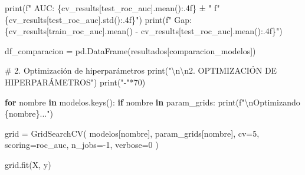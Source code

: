 \documentclass[
  doc,
  floatsintext,
  longtable,
  a4paper,
  nolmodern,
  notxfonts,
  notimes,
  12pt,
  colorlinks=true,linkcolor=blue,citecolor=blue,urlcolor=blue]{apa7}
\newenvironment{Shaded}{\begin{snugshade}}{\end{snugshade}}
\newcommand{\BuiltInTok}[1]{\textcolor[rgb]{0.00,0.23,0.31}{#1}}
\newcommand{\CharTok}[1]{\textcolor[rgb]{0.13,0.47,0.30}{#1}}
\newcommand{\CommentTok}[1]{\textcolor[rgb]{0.37,0.37,0.37}{#1}}
\newcommand{\ControlFlowTok}[1]{\textcolor[rgb]{0.00,0.23,0.31}{\textbf{#1}}}
\newcommand{\DecValTok}[1]{\textcolor[rgb]{0.68,0.00,0.00}{#1}}
\newcommand{\KeywordTok}[1]{\textcolor[rgb]{0.00,0.23,0.31}{\textbf{#1}}}
\newcommand{\NormalTok}[1]{\textcolor[rgb]{0.00,0.23,0.31}{#1}}
\newcommand{\OperatorTok}[1]{\textcolor[rgb]{0.37,0.37,0.37}{#1}}
\newcommand{\SpecialCharTok}[1]{\textcolor[rgb]{0.37,0.37,0.37}{#1}}
\newcommand{\SpecialStringTok}[1]{\textcolor[rgb]{0.13,0.47,0.30}{#1}}
\newcommand{\StringTok}[1]{\textcolor[rgb]{0.13,0.47,0.30}{#1}}
\begin{document}
\begin{Shaded}
\begin{Highlighting}[]
        \BuiltInTok{print}\NormalTok{(}\SpecialStringTok{f"  AUC: }\SpecialCharTok{\{}\NormalTok{cv\_results[}\StringTok{\textquotesingle{}test\_roc\_auc\textquotesingle{}}\NormalTok{]}\SpecialCharTok{.}\NormalTok{mean()}\SpecialCharTok{:.4f\}}\SpecialStringTok{ ± "}
              \SpecialStringTok{f"}\SpecialCharTok{\{}\NormalTok{cv\_results[}\StringTok{\textquotesingle{}test\_roc\_auc\textquotesingle{}}\NormalTok{]}\SpecialCharTok{.}\NormalTok{std()}\SpecialCharTok{:.4f\}}\SpecialStringTok{"}\NormalTok{)}
        \BuiltInTok{print}\NormalTok{(}\SpecialStringTok{f"  Gap: }\SpecialCharTok{\{}\NormalTok{cv\_results[}\StringTok{\textquotesingle{}train\_roc\_auc\textquotesingle{}}\NormalTok{]}\SpecialCharTok{.}\NormalTok{mean() }\OperatorTok{{-}}\NormalTok{ cv\_results[}\StringTok{\textquotesingle{}test\_roc\_auc\textquotesingle{}}\NormalTok{]}\SpecialCharTok{.}\NormalTok{mean()}\SpecialCharTok{:.4f\}}\SpecialStringTok{"}\NormalTok{)}
    
\NormalTok{    df\_comparacion }\OperatorTok{=}\NormalTok{ pd.DataFrame(resultados[}\StringTok{\textquotesingle{}comparacion\_modelos\textquotesingle{}}\NormalTok{])}
    
    \CommentTok{\# 2. Optimización de hiperparámetros}
    \BuiltInTok{print}\NormalTok{(}\StringTok{"}\CharTok{\textbackslash{}n\textbackslash{}n}\StringTok{2. OPTIMIZACIÓN DE HIPERPARÁMETROS"}\NormalTok{)}
    \BuiltInTok{print}\NormalTok{(}\StringTok{"{-}"}\OperatorTok{*}\DecValTok{70}\NormalTok{)}
    
    \ControlFlowTok{for}\NormalTok{ nombre }\KeywordTok{in}\NormalTok{ modelos.keys():}
        \ControlFlowTok{if}\NormalTok{ nombre }\KeywordTok{in}\NormalTok{ param\_grids:}
            \BuiltInTok{print}\NormalTok{(}\SpecialStringTok{f"}\CharTok{\textbackslash{}n}\SpecialStringTok{Optimizando }\SpecialCharTok{\{}\NormalTok{nombre}\SpecialCharTok{\}}\SpecialStringTok{..."}\NormalTok{)}
            
\NormalTok{            grid }\OperatorTok{=}\NormalTok{ GridSearchCV(}
\NormalTok{                modelos[nombre],}
\NormalTok{                param\_grids[nombre],}
\NormalTok{                cv}\OperatorTok{=}\DecValTok{5}\NormalTok{,}
\NormalTok{                scoring}\OperatorTok{=}\StringTok{\textquotesingle{}roc\_auc\textquotesingle{}}\NormalTok{,}
\NormalTok{                n\_jobs}\OperatorTok{={-}}\DecValTok{1}\NormalTok{,}
\NormalTok{                verbose}\OperatorTok{=}\DecValTok{0}
\NormalTok{            )}
            
\NormalTok{            grid.fit(X, y)}
            

\end{Highlighting}
\end{Shaded}
\end{document}
